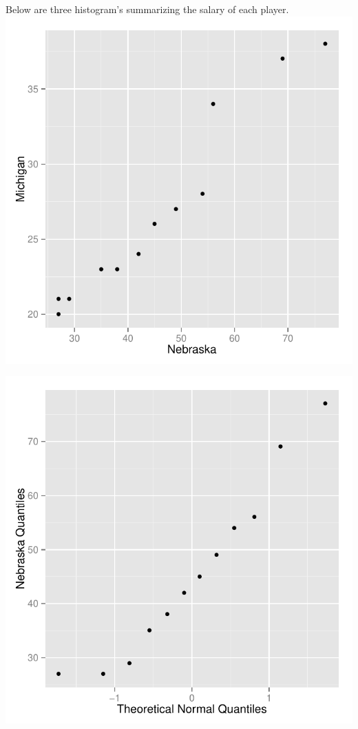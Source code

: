 \documentclass[11pt]{article}\usepackage[]{graphicx}\usepackage[]{color}
\makeatletter
\def\maxwidth{ %
  \ifdim\Gin@nat@width>\linewidth
    \linewidth
  \else
    \Gin@nat@width
  \fi
}
\newenvironment{knitrout}{}{} %
\makeatother
\begin{document}
   
   Below are three histogram's summarizing the salary of each player. \\

\begin{knitrout}
\color{fgcolor}
\includegraphics[width=\maxwidth]{figure/unnamed-chunk-2-1} 

\end{knitrout}

\begin{knitrout}
\color{fgcolor}
\includegraphics[width=\maxwidth]{figure/unnamed-chunk-3-1} 

\end{knitrout}
\end{document}
